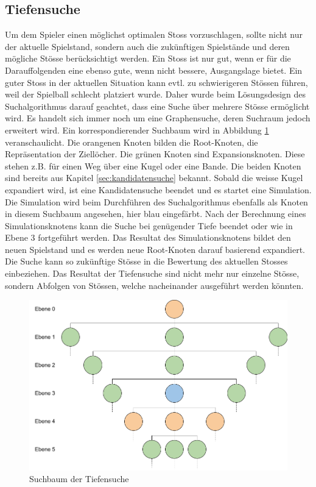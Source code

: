 \subsection{Tiefensuche}
Um dem Spieler einen möglichst optimalen Stoss vorzuschlagen, sollte nicht nur der aktuelle Spielstand,
sondern auch die zukünftigen Spielstände und deren mögliche Stösse berücksichtigt werden.
Ein Stoss ist nur gut, wenn er für die Darauffolgenden eine ebenso gute, wenn nicht bessere, Ausgangslage bietet.
Ein guter Stoss in der aktuellen Situation kann evtl. zu schwierigeren Stössen führen, weil der Spielball schlecht platziert wurde.
Daher wurde beim Lösungsdesign des Suchalgorithmus darauf geachtet, dass eine Suche über mehrere Stösse ermöglicht wird.
Es handelt sich immer noch um eine Graphensuche, deren Suchraum jedoch erweitert wird.
Ein korrespondierender Suchbaum wird in Abbildung \ref{fig:suchbaum_tiefensuche} veranschaulicht.
Die orangenen Knoten bilden die Root-Knoten, die Repräsentation der Ziellöcher. Die grünen Knoten sind
Expansionsknoten. Diese stehen z.B. für einen Weg über eine Kugel oder eine Bande. Die beiden Knoten sind bereits aus
Kapitel \ref{sec:kandidatensuche} bekannt. Sobald die weisse Kugel expandiert wird, ist eine Kandidatensuche beendet und
es startet eine Simulation. Die Simulation wird beim Durchführen des Suchalgorithmus ebenfalls als Knoten in diesem
Suchbaum angesehen, hier blau eingefärbt. Nach der Berechnung eines Simulationsknotens kann die Suche bei genügender
Tiefe beendet oder wie in Ebene 3 fortgeführt werden. Das Resultat des Simulationsknotens bildet den neuen Spielstand
und es werden neue Root-Knoten darauf basierend expandiert. Die Suche kann so zukünftige Stösse in die Bewertung
des aktuellen Stosses einbeziehen.
Das Resultat der Tiefensuche sind nicht mehr nur einzelne Stösse, sondern Abfolgen von Stössen, welche nacheinander
ausgeführt werden könnten.

\begin{figure}[h!]
    \begin{center}
        \includegraphics[width=0.7\linewidth]{../common/03_billiard_ai/resources/38_tiefensuche_suchbaum.png}
    \end{center}
    \caption{Suchbaum der Tiefensuche}
    \label{fig:suchbaum_tiefensuche}
\end{figure}

